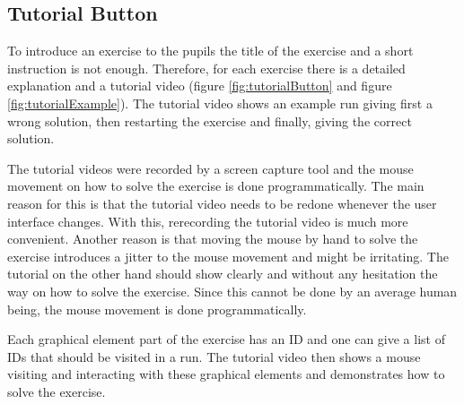 \subsection*{Tutorial Button}
To introduce an exercise to the pupils the title of the exercise and a short instruction is not enough. Therefore, for each exercise there is a detailed explanation and a tutorial video (figure \ref{fig:tutorialButton} and figure \ref{fig:tutorialExample}). The tutorial video shows an example run giving first a wrong solution, then restarting the exercise and finally, giving the correct solution.

The tutorial videos were recorded by a screen capture tool and the mouse movement on how to solve the exercise is done programmatically. The main reason for this is that the tutorial video needs to be redone whenever the user interface changes. With this, rerecording the tutorial video is much more convenient. Another reason is that moving the mouse by hand to solve the exercise introduces a jitter to the mouse movement and might be irritating. The tutorial on the other hand should show clearly and without any hesitation the way on how to solve the exercise. Since this cannot be done by an average human being, the mouse movement is done programmatically. 

Each graphical element part of the exercise has an ID and one can give a list of IDs that should be visited in a run. The tutorial video then shows a mouse visiting and interacting with these graphical elements and demonstrates how to solve the exercise. 

